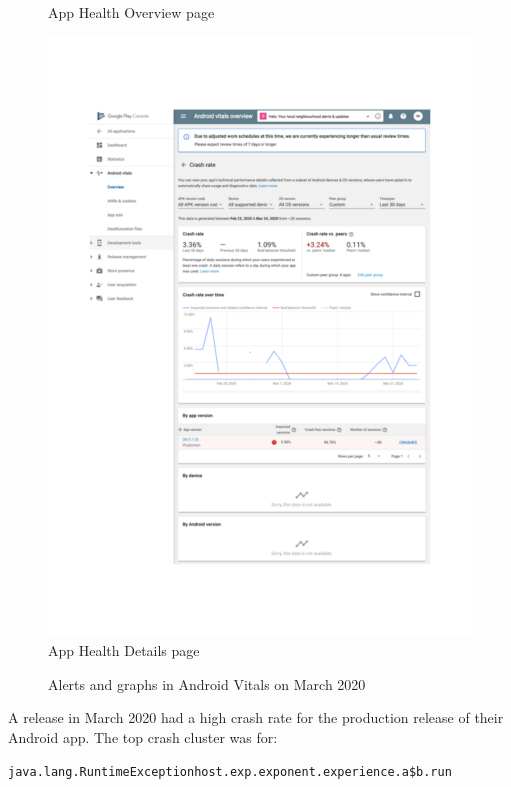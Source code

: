 \begin{figure}[htbp!]
\begin{minipage}{.47\linewidth}
  {\footnotesize App Health Overview page}
\end{minipage}\hfill%
\begin{minipage}{.47\linewidth}%
  \centering
  \includegraphics[width=\linewidth]{images/localhalo/apphealthdetailsplace_55505963_high_errors.pdf}
  {\footnotesize App Health Details page}
\end{minipage}%
    \caption{Alerts and graphs in Android Vitals on  March 2020}
    \label{fig:localhalo-android-vitals-high-failures-26-march-2020}
\end{figure}

A release in March 2020 had a high crash rate for the production release of their Android app. The top crash cluster was for:

{\small \texttt{java.lang.RuntimeExceptionhost.exp.exponent.experience.a\$b.run}} 

